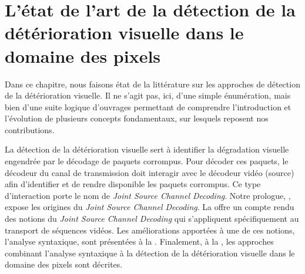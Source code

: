 \chapter{L'état de l'art de la détection de la détérioration visuelle dans le domaine des pixels}
\label{chap-revuelit}
Dans ce chapitre, nous faisons état de la littérature sur les approches de
détection de la détérioration visuelle. Il ne s’agit pas, ici, d’une simple
énumération, mais bien d’une suite logique d’ouvrages permettant de comprendre
l’introduction et l’évolution de plusieurs concepts fondamentaux, sur lesquels
reposent nos contributions.

La détection de la détérioration visuelle sert à identifier la dégradation
visuelle engendrée par le décodage de paquets corrompus. Pour décoder ces
paquets, le décodeur du canal de transmission doit interagir avec le décodeur
vidéo (source) afin d'identifier et de rendre disponible les paquets corrompus.
Ce type d'interaction porte le nom de \textit{Joint Source Channel Decoding}.
Notre prologue, , expose les origines du \textit{Joint
Source Channel Decoding}. La  offre un compte rendu des
notions du \textit{Joint Source Channel Decoding} qui s'appliquent
spécifiquement au transport de séquences vidéos. Les améliorations apportées à
une de ces notions, l'analyse syntaxique, sont présentées à la
. Finalement, à la , les
approches combinant l'analyse syntaxique à la détection de la détérioration
visuelle dans le domaine des pixels sont décrites.

